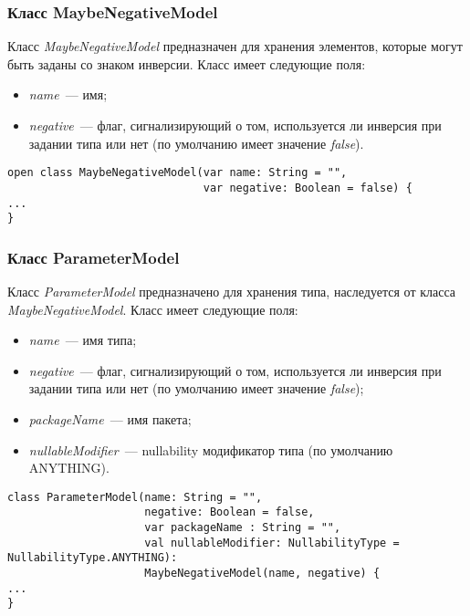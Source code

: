 \subsubsection{Класс MaybeNegativeModel}
\label{ssub:MaybeNegativeModel}
Класс \textit{MaybeNegativeModel} предназначен для хранения элементов, которые
могут быть заданы со знаком инверсии.
Класс имеет следующие поля:
\begin{itemize}
	\item \textit{name}~--- имя;
	\item \textit{negative}~--- флаг, сигнализирующий о том, используется ли
		  инверсия при задании типа или нет (по умолчанию имеет значение
		  \textit{false}).
\end{itemize}

\begin{lstlisting}[style={java}, label={lst:MaybeNegativeModel},
  caption={Класс MaybeNegativeModel}]
open class MaybeNegativeModel(var name: String = "",
                              var negative: Boolean = false) {
...
}
\end{lstlisting}
\subsubsection{Класс ParameterModel}
\label{ssub:ParameterModel}
Класс \textit{ParameterModel} предназначено для хранения типа, наследуется от
класса \textit{MaybeNegativeModel}.
Класс имеет следующие поля:
\begin{itemize}
	\item \textit{name}~--- имя типа;
	\item \textit{negative}~--- флаг, сигнализирующий о том, используется ли
		  инверсия при задании типа или нет (по умолчанию имеет значение
		  \textit{false});
	\item \textit{packageName}~--- имя пакета;
	\item \textit{nullableModifier}~--- nullability модификатор типа (по
		  умолчанию ANYTHING).
\end{itemize}

\begin{lstlisting}[style={java}, label={lst:ParameterModel},
  caption={Класс ParameterModel}]
class ParameterModel(name: String = "",
                     negative: Boolean = false,
                     var packageName : String = "",
                     val nullableModifier: NullabilityType = NullabilityType.ANYTHING):
                     MaybeNegativeModel(name, negative) {
...
}
\end{lstlisting}
